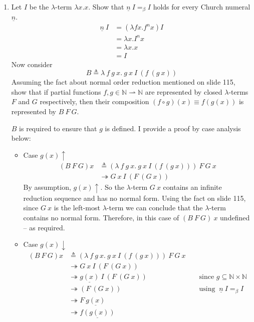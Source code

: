 \documentclass[10pt,\jkfside,a4paper]{article}
\begin{document}
\begin{enumerate}[label=\arabic*.]
\begin{itemize}
\end{itemize}

\item Let $I$ be the $\lambda$-term $\lambda x. x$. Show that
$\underline{n}\ I =_\beta I$ holds for every Church numeral $\underline{n}$.
\begin{align*}
\underline{n}\ I &=
(\lambda fx. f^n x) I \\
&= \lambda x. I^n x \\
&= \lambda x. x \\
&= I
\end{align*}
Now consider
\[
B \triangleq \lambda\ f\ g\ x.\ g\ x\ I\ (f\ (g\ x))
\]
Assuming the fact about normal order reduction mentioned on slide 115, show
that if partial functions $f, g \in \mathbb{N} \rightharpoonup \mathbb{N} $
are represented by closed $\lambda$-terms $F$ and $G$ respectively, then
their composition $(f \circ g)(x) \equiv f(g(x))$ is represented by
$B\ F\ G$.

$B$ is required to ensure that $g$ is defined. I provide a proof by case
analysis below:

\begin{itemize}

\item Case $g(x)\uparrow$
\begin{align*}
(B\ F\ G)x &\triangleq (\lambda\ f\ g\ x.\ g\ x\ I\ (f\ (g\ x)))\ F\ G\ x \\
&\twoheadrightarrow G\ x\ I\ (F\ (G\ x))
\end{align*}
By assumption, $g(x)\uparrow$. So the $\lambda$-term $G\ x$ contains an
infinite reduction sequence and has no normal form. Using the fact on slide
115, since $G\ x$ is the left-most $\lambda$-term we can conclude that the
$\lambda$-term contains no normal form. Therefore, in this case of $(B\ F\
G)\ x$ undefined -- as required.

\item Case $g(x)\downarrow$
\begin{align*}
(B\ F\ G)x &\triangleq (\lambda\ f\ g\ x.\ g\ x\ I\ (f\ (g\ x)))\ F\ G\ x && \\
&\twoheadrightarrow G\ x\ I\ (F\ (G\ x)) &&\\
&\twoheadrightarrow \underline{g(x)}\ I\ (F\ (G\ x)) &&\text{ since $g
\subseteq \mathbb{N} \times \mathbb{N}$} \\
&\twoheadrightarrow (F\ (G\ x)) &&\text{ using }\ \underline{n}\ I =_\beta
I \\
&\twoheadrightarrow F\ \underline{g(x)} && \\
&\twoheadrightarrow \underline{f(g(x))} &&
\end{align*}

\end{itemize}

\end{enumerate}
\end{document}

